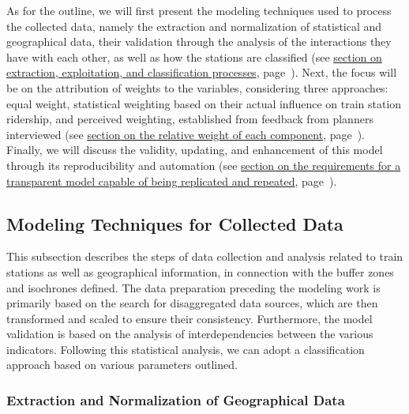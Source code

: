 \begin{refsegment}
As for the outline, we will first present the modeling techniques used to process the collected data, namely the extraction and normalization of statistical and geographical data, their validation through the analysis of the interactions they have with each other, as well as how the stations are classified (see \hyperref[chap6:methodologie-statistiques]{section on extraction, exploitation, and classification processes}, page~\pageref{chap6:methodologie-statistiques}). Next, the focus will be on the attribution of weights to the variables, considering three approaches: equal weight, statistical weighting based on their actual influence on train station ridership, and perceived weighting, established from feedback from planners interviewed (see \hyperref[chap6:methodologie-ponderation-indicateurs]{section on the relative weight of each component}, page~\pageref{chap6:methodologie-ponderation-indicateurs}). Finally, we will discuss the validity, updating, and enhancement of this model through its reproducibility and automation (see \hyperref[chap6:conclusion-valorisation]{section on the requirements for a transparent model capable of being replicated and repeated}, page~\pageref{chap6:conclusion-valorisation}).

\subsection{Modeling Techniques for Collected Data
    \label{chap6:methodologie-statistiques}
    }

This subsection describes the steps of data collection and analysis related to train stations as well as geographical information, in connection with the buffer zones and isochrones defined. The data preparation preceding the modeling work is primarily based on the search for disaggregated data sources, which are then transformed and scaled to ensure their consistency. Furthermore, the model validation is based on the analysis of interdependencies between the various indicators. Following this statistical analysis, we can adopt a classification approach based on various parameters outlined.%

\subsubsection*{Extraction and Normalization of Geographical Data
    \label{chap6:methodologie-statistiques-normalisation}
    }


\end{refsegment}
